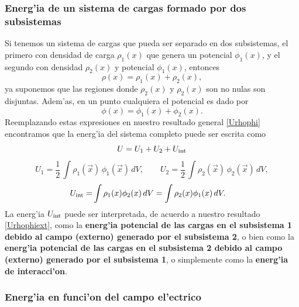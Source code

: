 \subsubsection{Energ'ia de un sistema de cargas formado por dos subsistemas}
Si tenemos un sistema de cargas que pueda ser separado en dos subsistemas, el primero con densidad de carga $\rho_1(x)$ que genera un potencial $\phi_1(x)$, y el segundo con densidad $\rho_2(x)$ y potencial $\phi_1(x)$, entonces 
\begin{equation}
\rho(x)=\rho_1(x)+\rho_2(x),
\end{equation}
ya suponemos que las regiones donde $\rho_2(x)$ y $\rho_2(x)$ son no nulas son disjuntas. Adem'as, en un punto cualquiera el potencial es dado por
\begin{equation}
\phi(x)=\phi_1(x)+\phi_2(x).
\end{equation}
Reemplazando estas expresiones en nuestro resultado general \eqref{Urhophi} encontramos que  la energ'ia del sistema completo puede ser escrita como
\begin{equation}
U=U_1+U_2+U_{\rm int}
\end{equation}
\begin{equation}
U_1= \frac{1}{2}\,\int\rho_1(\vec{x})\,\phi_1(\vec{x})\,dV ,\qquad U_2= \frac{1}{2}\,\int\rho_2(\vec{x})\,\phi_2(\vec{x})\,dV,
\end{equation}
\begin{align}
U_{\rm int} =& \int \rho_1(x)\phi_2(x)\,dV = \int \rho_2(x)\phi_1(x)\,dV.
\end{align}
La energ'ia $U_{\rm int}$ puede ser interpretada, de acuerdo a nuestro resultado \eqref{Urhophiext}, como la \textbf{energ'ia potencial de las cargas en el subsistema 1 debido al campo (externo) generado por el subsistema 2}, o bien como la \textbf{energ'ia potencial de las cargas en el subsistema 2 debido al campo (externo) generado por el subsistema 1}, o simplemente como la \textbf{energ'ia de interacci'on}.


\subsubsection{Energ'ia en funci'on del campo el'ectrico}

